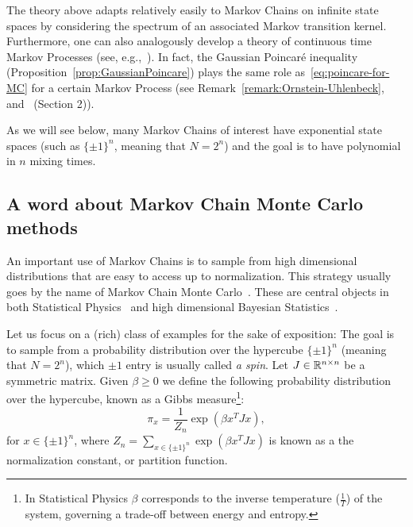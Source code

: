 \begin{remark}\label{remark:infiniteMarkovChains}
The theory above adapts relatively easily to Markov Chains on infinite state spaces by considering the spectrum of an associated Markov transition kernel. Furthermore, one can also analogously develop a theory of continuous time Markov Processes (see, e.g.,~\cite{FukushimaOshimaTakeda2011}). In fact, the Gaussian Poincar\'e inequality (Proposition~\ref{prop:GaussianPoincare}) plays the same role as~\eqref{eq:poincare-for-MC} for a certain Markov Process (see Remark~\ref{remark:Ornstein-Uhlenbeck}, and~\cite{vanHandel_LectureNotesProb_14} (Section 2)).
\end{remark}

As we will see below, many Markov Chains of interest have exponential state spaces (such as $\{\pm1\}^n$, meaning that $N=2^n$) and the goal is to have polynomial in $n$ mixing times.

\subsection{A word about Markov Chain Monte Carlo methods}

An important use of Markov Chains is to sample from high dimensional distributions that are easy to access up to normalization. This strategy usually goes by the name of Markov Chain Monte Carlo~\cite{hastings1970monte,robert1999monte}. These are central objects in both Statistical Physics~\cite{krauth2006statistical} and high dimensional Bayesian Statistics~\cite{gelman1995bayesian}. 


Let us focus on a (rich) class of examples for the sake of exposition: The goal is to sample from a probability distribution over the hypercube $\{\pm1\}^n$ (meaning that $N=2^n$), which $\pm1$ entry is usually called \emph{a spin}. Let $J\in\mathbb{R}^{n\times n}$ be a symmetric matrix. Given $\beta\geq 0$ we define the following probability distribution over the hypercube, known as a Gibbs measure\footnote{In Statistical Physics $\beta$ corresponds to the inverse temperature ($\frac{1}{T}$) of the system, governing a trade-off between energy and entropy.}:
\begin{equation}\label{eq:gibbsmeasurexTJx}
\pi_x = \frac{1}{Z_n}\exp{\left(\beta x^TJx\right)},
\end{equation}
for $x\in\{\pm1\}^n$, where $Z_n = \sum_{x\in\{\pm1\}^n}\exp{\left(\beta x^TJx\right)}$ is known as a the normalization constant, or partition function.

